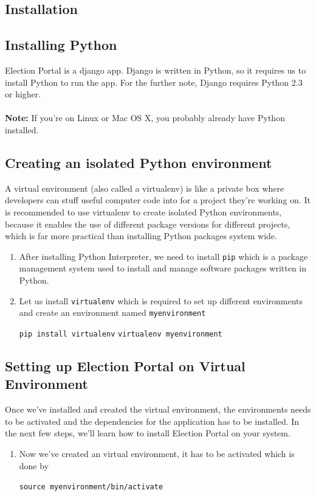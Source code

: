 \documentclass[12pt, a4paper, titlepage]{article}
\begin{document}
\begin{appendices}
\section{Installation}
\subsection{Installing Python}

Election Portal is a django app. Django is written in Python, so it requires us to install Python to run the app. For the further note, Django requires Python 2.3 or higher. \\ \\
\textbf{Note:} If you’re on Linux or Mac OS X, you probably already have Python installed.

\subsection{Creating an isolated Python environment}
A virtual environment (also called a virtualenv) is like a private box where developers can stuff useful computer code into for a project they're working on. It is recommended to use virtualenv to create isolated Python environments, because it enables the use of different package versions for different projects, which is far more practical than installing Python packages system wide.
\begin{enumerate}
\item After installing Python Interpreter, we need to install \verb|pip| which is a package management system used to install and manage software packages written in Python.     

\item Let us install \verb|virtualenv| which is required to set up different environments and create an environment named \verb|myenvironment|
\begin{center}
\verb|pip install virtualenv|
\verb|virtualenv myenvironment|
\end{center}
\end{enumerate}

\subsection{Setting up Election Portal on Virtual Environment}
Once we've installed and created the virtual environment, the environments needs to be activated and the dependencies for the application has to be installed. In the next few steps, we'll learn how to install Election Portal on your system.
\begin{enumerate}
\item Now we've created an virtual environment, it has to be activated which is done by
\begin{center}
\verb|source myenvironment/bin/activate|
\end{center}


\end{enumerate}
\end{appendices}
\end{document}
